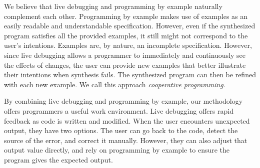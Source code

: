 We believe that live debugging and programming by example naturally complement each other.
Programming by example makes use of examples as an easily readable and understandable specification. However, even if the synthesized program satisfies all the provided examples, it still might not correspond to the user's intentions. Examples are, by nature, an incomplete specification. However, since live debugging allows a programmer to immediately and continuously see the effects of changes, the user can provide new examples that better illustrate their intentions when synthesis fails. The synthesized program can then be refined with each new example. We call this approach {\emph{cooperative programming}}.

By combining live debugging and programming by example,
our methodology offers programmers a useful work environment.
Live debugging offers rapid feedback as code is written and modified. 
When the user encounters unexpected output, they have two options.
The user can go back to the code, detect
the source of the error, and correct it manually.
However, they can also adjust that output value directly,
and rely on programming by example to ensure the program gives the expected output.





